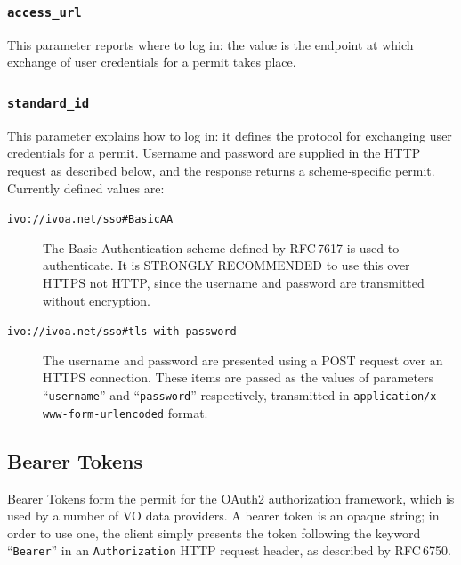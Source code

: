 \documentclass[11pt,a4paper]{ivoa}
\newcommand{\rfc}[1]{RFC\,#1}
\newcommand{\header}[1]{{\tt #1}}
\begin{document}
\subsubsection{\mbox{\tt access\_url}}
\label{sec:access-url}

This parameter reports where to log in:
the value is the endpoint at which
exchange of user credentials for a permit
takes place.

\subsubsection{\mbox{\tt standard\_id}}
\label{sec:standard-id}

This parameter explains how to log in:
it defines the protocol for exchanging user credentials
for a permit.
Username and password are supplied in the HTTP request as described below,
and the response returns a scheme-specific permit.
Currently defined values are:

\begin{description}
  \item[{\tt ivo://ivoa.net/sso\#BasicAA}]
        The Basic Authentication scheme defined by \rfc{7617} is used to
        authenticate.
        It is STRONGLY RECOMMENDED to use this over HTTPS not HTTP,
        since the username and password are transmitted without encryption.
  \item[{\tt ivo://ivoa.net/sso\#tls-with-password}]
        The username and password are presented using a POST request
        over an HTTPS connection.
        These items are passed as the values of parameters
        ``{\tt username}'' and ``{\tt password}'' respectively,
        transmitted in {\tt application/x-www-form-urlencoded} format.
\end{description}



\subsection{Bearer Tokens}

Bearer Tokens form the permit for
the OAuth2 authorization framework,
which is used by a number of VO data providers.
A bearer token is an opaque string;
in order to use one, the client simply presents the token
following the keyword ``{\tt Bearer}''
in an \header{Authorization} HTTP request header,
as described by \rfc{6750}.
\end{document}
